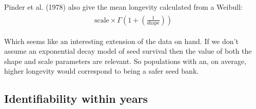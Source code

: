 \documentclass[12pt, oneside, titlepage]{article}   	%
\begin{document}
Pinder et al. (1978) also give the mean longevity calculated from a Weibull:
%
\begin{align}
  \begin{split}
\mathrm{scale} \times \Gamma(1+(\frac{1}{\mathrm{shape}}))
  \end{split}
\end{align}

Which seems like an interesting extension of the data on hand. If we don't assume an exponential decay model of seed survival then the value of both the shape and scale parameters are relevant. So populations with an, on average, higher longevity would correspond to being a safer seed bank.


\clearpage
\newpage

\subsection*{Identifiability within years}
\end{document}
